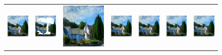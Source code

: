 \documentclass[10pt,journal,compsoc]{IEEEtran}
\begin{document}
\begin{figure}[hbt]
	\small
	\setlength{\tabcolsep}{2.0pt}
	\centering
	\begin{tabular}{ccccccc}
		
		\includegraphics[width=.135\textwidth]{places/GT4-0}  &
		\includegraphics[width=.135\textwidth]{places/input4-0}  &
		\includegraphics[width=.135\textwidth]{places/pconv4-0}  &
		\includegraphics[width=.135\textwidth]{places/gc4-0}  &
		\includegraphics[width=.135\textwidth]{places/ec4-0}  &
		\includegraphics[width=.135\textwidth]{places/MEDFE4-0}  &
		\includegraphics[width=.135\textwidth]{places/ours4-0}  \\
		

\end{tabular}
\end{figure}
\end{document}
